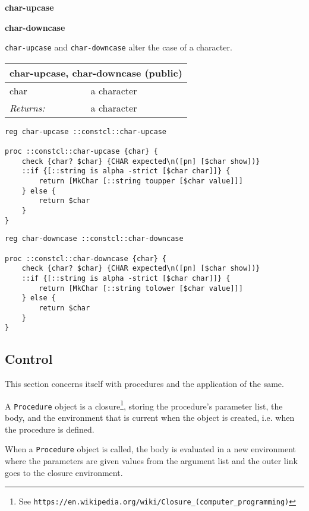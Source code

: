 \documentclass{report}
\begin{document}
\textbf{char-upcase}


\textbf{char-downcase}


\texttt{char-upcase} and \texttt{char-downcase} alter the case of a character.

\begin{tabular}{ |l l| }
\hline
\multicolumn{2}{|l|}{char-upcase, char-downcase (public)} \\
\hline
char & a character \\
\textit{Returns:} & a character \\
\hline
\end{tabular}

\noindent\makebox[\linewidth]{\rule{\linewidth}{0.4pt}}
\begin{lstlisting}
reg char-upcase ::constcl::char-upcase
 
proc ::constcl::char-upcase {char} {
    check {char? $char} {CHAR expected\n([pn] [$char show])}
    ::if {[::string is alpha -strict [$char char]]} {
        return [MkChar [::string toupper [$char value]]]
    } else {
        return $char
    }
}
\end{lstlisting}
\noindent\makebox[\linewidth]{\rule{\linewidth}{0.4pt}}
\noindent\makebox[\linewidth]{\rule{\linewidth}{0.4pt}}
\begin{lstlisting}
reg char-downcase ::constcl::char-downcase
 
proc ::constcl::char-downcase {char} {
    check {char? $char} {CHAR expected\n([pn] [$char show])}
    ::if {[::string is alpha -strict [$char char]]} {
        return [MkChar [::string tolower [$char value]]]
    } else {
        return $char
    }
}
\end{lstlisting}
\noindent\makebox[\linewidth]{\rule{\linewidth}{0.4pt}}
\subsection{Control}
\label{control}

This section concerns itself with procedures and the application of the same.


A \texttt{Procedure} object is a closure\footnote{See \texttt{https://en.wikipedia.org/wiki/Closure\_(computer\_programming)}}, storing the procedure's parameter list, the body, and the environment that is current when the object is created, i.e. when the procedure is defined.


When a \texttt{Procedure} object is called, the body is evaluated in a new environment where the parameters are given values from the argument list and the outer link goes to the closure environment.
\end{document}
